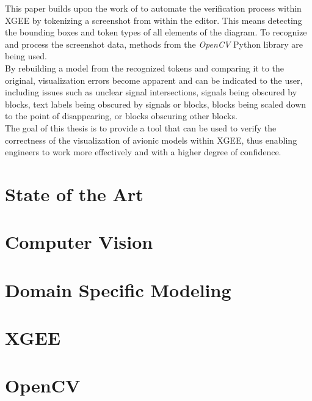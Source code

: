 This paper builds upon the work of \cite{og_paper} to automate the verification process within XGEE by tokenizing a screenshot from within the editor. This means detecting the bounding boxes and token types of all elements of the diagram. To recognize and process the screenshot data, methods from the \textit{OpenCV } Python library are being used.\\
By rebuilding a model from the recognized tokens and comparing it to the original, visualization errors become apparent and can be indicated to the user, including issues such as unclear signal intersections, signals being obscured by blocks, text labels being obscured by signals or blocks, blocks being scaled down to the point of disappearing, or blocks obscuring other blocks.\\
The goal of this thesis is to provide a tool that can be used to verify the correctness of the visualization of avionic models within XGEE, thus enabling engineers to work more effectively and with a higher degree of confidence.

\section{State of the Art}
\label{sec_state_of_the_art}



\section{Computer Vision}
    
\section{Domain Specific Modeling}

\section{XGEE}

\section{OpenCV}